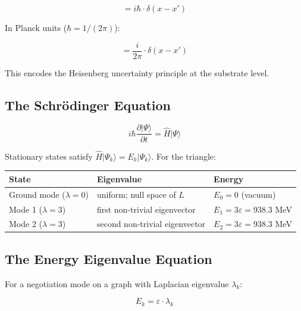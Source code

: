 \documentclass[11pt,letterpaper]{article}
\begin{document}
\begin{equation}
[\hat{N}(x), \hat{\Pi}(x')] = i\hbar \cdot \delta(x - x')
\end{equation}

In Planck units (\(\hbar = 1/(2\pi)\)):

\begin{equation}
[\hat{N}(x), \hat{\Pi}(x')] = \frac{i}{2\pi} \cdot \delta(x - x')
\end{equation}

This encodes the Heisenberg uncertainty principle at the substrate level.

\subsection{The Schrödinger Equation}
\label{sec:orgb9db0e8}

\begin{equation}
i\hbar \frac{\partial |\Psi\rangle}{\partial t} = \hat{H}|\Psi\rangle
\end{equation}

Stationary states satisfy \(\hat{H}|\Psi_k\rangle = E_k|\Psi_k\rangle\). For the triangle:

\begin{center}
\begin{tabular}{lll}
\toprule
\textbf{State} & \textbf{Eigenvalue} & \textbf{Energy}\\[0pt]
\midrule
Ground mode (\(\lambda=0\)) & uniform; null space of \(L\) & \(E_0 = 0\) (vacuum)\\[0pt]
Mode 1 (\(\lambda=3\)) & first non-trivial eigenvector & \(E_1 = 3\varepsilon = 938.3\) MeV\\[0pt]
Mode 2 (\(\lambda=3\)) & second non-trivial eigenvector & \(E_2 = 3\varepsilon = 938.3\) MeV\\[0pt]
\bottomrule
\end{tabular}
\end{center}

\subsection{The Energy Eigenvalue Equation}
\label{sec:org1cb527d}

For a negotiation mode on a graph with Laplacian eigenvalue \(\lambda_k\):

\begin{equation}
E_k = \varepsilon \cdot \lambda_k
\end{equation}
\end{document}
